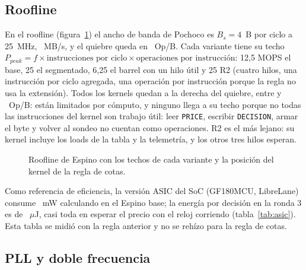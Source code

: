 \documentclass[11pt,a4paper]{article}
\newcommand{\tablaancha}[1]{\resizebox{\linewidth}{!}{}}
\begin{document}
\begin{table}[H]\centering
\caption{Escalera de co-diseño sobre el kernel de \texttt{max\_media}, la regla anterior.}\label{tab:escalera}
\tablaancha{generado/t33escalera.tex}
\end{table}

\subsection{Roofline}

En el roofline (figura~\ref{fig:roofline}) el ancho de banda de Pochoco es $B_s = 4$~B por ciclo a 25~MHz, \pSieteBs~MB/s, y el quiebre queda en \pSieteQuiebre~Op/B. Cada variante tiene su techo $P_{peak} = f \times \text{instrucciones por ciclo} \times \text{operaciones por instrucción}$: 12,5 MOPS el base, 25 el segmentado, 6,25 el barrel con un hilo útil y 25 R2 (cuatro hilos, una instrucción por ciclo agregada, una operación por instrucción porque la regla no usa la extensión). Todos los kernels quedan a la derecha del quiebre, entre \cifraCotasIntMin{} y \cifraCotasIntMax~Op/B: están limitados por cómputo, y ninguno llega a su techo porque no todas las instrucciones del kernel son trabajo útil: leer \texttt{PRICE}, escribir \texttt{DECISION}, armar el byte y volver al sondeo no cuentan como operaciones. R2 es el más lejano: su kernel incluye los loads de la tabla y la telemetría, y los otros tres hilos esperan.

\begin{figure}[H]\centering
\resizebox{0.9\linewidth}{!}{}
\caption{Roofline de Espino con los techos de cada variante y la posición del kernel de la regla de cotas.}\label{fig:roofline}
\end{figure}

Como referencia de eficiencia, la versión ASIC del SoC (GF180MCU, LibreLane) consume \pSieteAsicPcalculoBase~mW calculando en el Espino base; la energía por decisión en la ronda 3 es de \pSieteAsicErtresBase~$\mu$J, casi toda en esperar el precio con el reloj corriendo (tabla~\ref{tab:asic}). Esta tabla se midió con la regla anterior y no se rehízo para la regla de cotas.

\begin{table}[H]\centering
\caption{Edición ASIC: Ops/W y energía por decisión, con \texttt{max\_media}.}\label{tab:asic}

\end{table}

\subsection{PLL y doble frecuencia}
\end{document}
